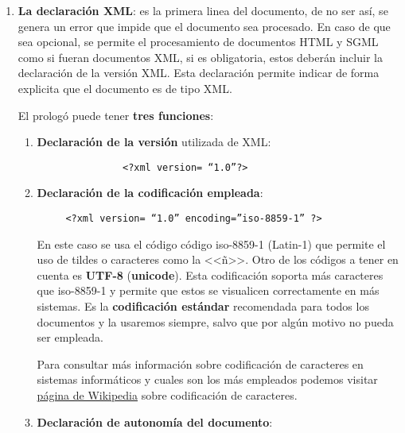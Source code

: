 \begin{enumerate}
    \item\textbf{La declaración XML}: es la primera linea del documento, de no ser así, se genera un error que impide que el documento sea procesado. En caso de que sea opcional, se permite el procesamiento de documentos HTML y SGML como si fueran documentos XML, si es obligatoria, estos deberán incluir la declaración de la versión XML. Esta declaración permite indicar de forma explicita que el documento es de tipo XML.

    El prologó puede tener \textbf{tres funciones}:

    \begin{enumerate}
        \item \textbf{Declaración de la versión} utilizada de XML:
        \begin{tcolorbox}[sharp corners, colback=yellow!40, colframe=white!20]
             \begin{verbatim}               <?xml version= “1.0”?>\end{verbatim}
         \end{tcolorbox}

         \item \textbf{Declaración de la codificación empleada}:
         \begin{tcolorbox}[sharp corners, colback=yellow!40, colframe=white!20]
          \begin{verbatim}     <?xml version= “1.0” encoding=”iso-8859-1” ?>\end{verbatim}
        \end{tcolorbox}

         En este caso se usa el código código iso-8859-1 (Latin-1) que permite el uso de tildes o caracteres como la <<ñ>>. Otro de los códigos a tener en cuenta es \textbf{\gls{UTF-8}} (\textbf{\gls{unicode}}). Esta codificación soporta más caracteres que iso-8859-1 y permite que estos se visualicen correctamente en más sistemas. Es la \textbf{codificación estándar} recomendada para todos los documentos y la usaremos siempre, salvo que por algún motivo no pueda ser empleada.

         Para consultar más información sobre codificación de caracteres en sistemas informáticos y cuales son los más empleados podemos visitar  \href{https://en.wikipedia.org/wiki/Character_encoding}{página de Wikipedia} sobre codificación de caracteres.

         \item \textbf{Declaración de autonomía del documento}:


\end{enumerate}
\end{enumerate}
